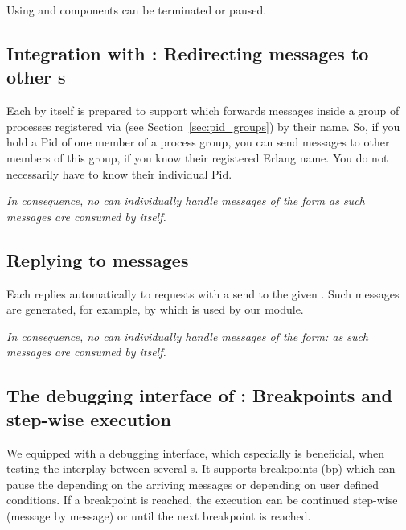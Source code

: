 Using  and
 components can be terminated or
paused.

\subsection{\texorpdfstring{Integration with :
  Redirecting messages  to other s}
  {Integration with pid\_groups:
  Redirecting messages  to other gen\_components}}

Each  by itself is prepared to support
 which forwards messages inside a
group of processes registered via  (see
Section~\ref{sec:pid_groups}) by their name. So, if you hold a Pid
of one member of a process group, you can send messages to other members of
this group, if you know their registered Erlang name. You do not necessarily
have to know their individual Pid.

\emph{In consequence, no  can individually handle
  messages of the form  \code{_, _\}} as such
  messages are consumed by  itself.}

\subsection{\texorpdfstring{Replying to  messages}
  {Replying to ping messages}}

Each  replies automatically to  requests with a  send to the given .  Such
messages are generated, for example, by  which is used
by our  module.

\emph{In consequence, no  can individually handle
messages of the form:  as such messages are consumed by
 itself.}


\subsection{\texorpdfstring{The debugging interface of :
  Breakpoints and step-wise execution}
  {The debugging interface of gen\_component: Breakpoints and step-wise execution}}

We equipped  with a debugging interface, which
especially is beneficial, when testing the interplay between several
s. It supports breakpoints (bp) which can pause the
 depending on the arriving messages or depending
on user defined conditions. If a breakpoint is reached, the execution can be
continued step-wise (message by message) or until the next breakpoint is
reached.

